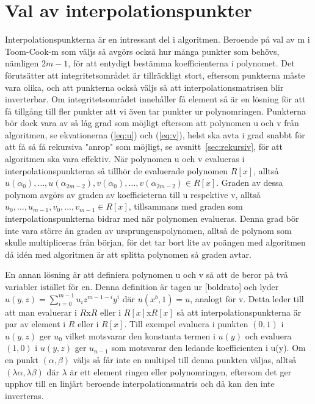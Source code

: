 \section{Val av interpolationspunkter}
Interpolationspunkterna är en intressant del i algoritmen. Beroende på val av m
i Toom-Cook-m som väljs så avgörs också hur många punkter som behövs, nämligen
$2m-1$, för att entydigt bestämma koefficienterna i polynomet. Det förutsätter
att integritetsområdet är tillräckligt stort, eftersom punkterna måste vara
olika, och att punkterna också väljs så att interpolationsmatrisen blir
inverterbar. Om integritetsområdet innehåller få element så är en lösning för
att få tillgång till fler punkter att vi även tar punkter ur polynomringen.
Punkterna bör dock vara av så låg grad som möjligt eftersom att polynomen u och
v från algoritmen, se ekvationerna (\ref {eq:u}) och (\ref{eq:v}), helst ska
avta i grad snabbt för att få så få rekursiva "anrop" som möjligt, se
avsnitt~\ref{sec:rekursiv}, för att algoritmen ska vara effektiv. När polynomen
u och v evalueras i interpolationspunkterna så tillhör de evaluerade polynomen
$R[x]$, alltså
$u(\alpha_0),\dots,u(\alpha_{2m-2}),v(\alpha_0),\dots,v(\alpha_{2m-2}) \in
R[x]$. Graden av dessa polynom avgörs av graden av koefficieterna till u
respektive v, alltså $u_0,\dots,u_{m-1},v_0,\dots,v_{m-1} \in R[x]$,
tillsammans med graden som interpolationspunkterna bidrar med när polynomen
evalueras. Denna grad bör inte vara större än graden av ursprungenspolynomen,
alltså de polynom som skulle multipliceras från början, för det tar bort lite
av poängen med algoritmen då idén med algoritmen är att splitta polynomen så
graden avtar.

En annan lösning är att definiera polynomen u och v så att de beror på två
variabler istället för en. Denna definition är tagen ur [boldrato] och lyder
$u(y,z) = \displaystyle\sum\limits_{i=0}^{m-1} {u_iz^{m-1-i}y^i}$ där $u(x^b,1)
= u$, analogt för v. Detta leder till att man evaluerar i $R$x$R$ eller i
$R[x]$x$R[x]$ så att interpolationspunkterna är par av element i $R$ eller i
$R[x]$. Till exempel evaluera i punkten $(0,1)$ i $u(y,z)$ ger $u_0$ vilket
motsvarar den konstanta termen i $u(y)$ och evaluera $(1,0)$ i $u(y,z)$ ger
$u_{n-1}$ som motsvarar den ledande koefficienten i u(y). Om en punkt
$(\alpha,\beta)$ väljs så får inte en multipel till denna punkten väljas,
alltså $(\lambda\alpha,\lambda\beta)$ där $\lambda$ är ett element ringen eller
polynomringen, eftersom det ger upphov till en linjärt beroende
interpolationsmatris och då kan den inte inverteras.
